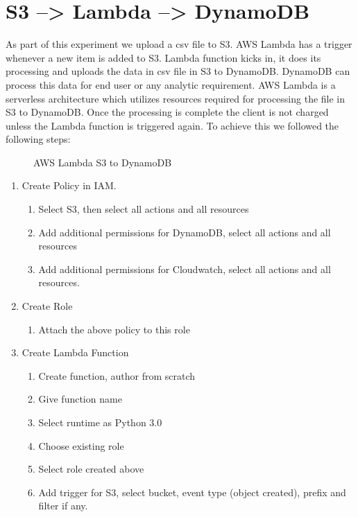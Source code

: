 \section{S3 --> Lambda --> DynamoDB}
As part of this experiment we upload a csv file to S3. AWS Lambda has a trigger whenever a new item is added to S3. Lambda function kicks in, it does its processing and uploads the data in csv file in S3 to DynamoDB. DynamoDB can process this data for end user or any analytic requirement. AWS Lambda is a serverless architecture which utilizes resources required for processing the file in S3 to DynamoDB. Once the processing is complete the client is not charged unless the Lambda function is triggered again. To achieve this we followed the following steps: \cite{ReadCSVFile}

\begin{figure}[!htb]
    \caption{\label{fig:S3_DynamoDB} AWS Lambda S3 to DynamoDB}
\end{figure}

\begin{enumerate}
 \item Create Policy in IAM. 
 \begin{enumerate}
 	\item Select S3, then select all actions and all resources
	\item Add additional permissions for DynamoDB, select all actions and all resources
	\item Add additional permissions for Cloudwatch, select all actions and all resources.
 \end{enumerate}  
 \item Create Role
 \begin{enumerate}
 	\item Attach the above policy to this role
\end{enumerate}
 \item Create Lambda Function
 \begin{enumerate} 
 	\item Create function, author from scratch
 	\item Give function name
 	\item Select runtime as Python 3.0
 	\item Choose existing role
 	\item Select role created above
 	\item Add trigger for S3, select bucket, event type (object created), prefix and filter if any.
 \end{enumerate}
\end{enumerate}

